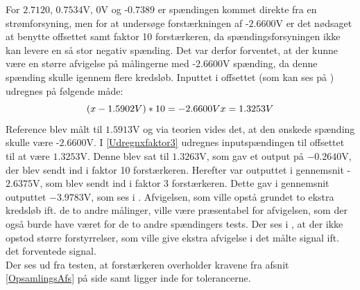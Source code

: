 For $2.7120$, $0.7534$V, $0$V og -$0.7389$ er spændingen kommet direkte fra en strømforsyning, men for at undersøge forstærkningen af -$2.6600$V er det nødsaget at benytte offsettet samt faktor 10 forstærkeren, da spændingsforsyningen ikke kan levere en så stor negativ spænding. Det var derfor forventet, at der kunne være en større afvigelse på målingerne med -$2.6600$V spænding, da denne spænding skulle igennem flere kredsløb. Inputtet i offsettet (som kan ses på ) udregnes på følgende måde:
\begin{equation}\label{Udregnxfaktor3}
( x - 1.5902V ) * 10 = -2.6600V \\
x = 1.3253V
\end{equation}
Reference blev målt til $1.5913$V og via teorien vides det, at den ønskede spænding skulle være -$2.6600$V. I \eqref{Udregnxfaktor3} udregnes inputspændingen til offsettet til at være $1.3253$V. Denne blev sat til $1.3263$V, som gav et output på $-0.2640$V, der blev sendt ind i faktor 10 forstærkeren. Herefter var outputtet i gennemsnit -$2.6375$V, som blev sendt ind i faktor 3 forstærkeren. Dette gav i gennemsnit outputtet $-3.9783$V, som ses i . Afvigelsen, som ville opstå grundet to ekstra kredsløb ift. de to andre målinger, ville være præsentabel for afvigelsen, som der også burde have været for de to andre spændingers tests. Der ses i , at der ikke opstod større forstyrrelser, som ville give ekstra afvigelse i det målte signal ift. det forventede signal. \\
Der ses ud fra testen, at forstærkeren overholder kravene fra afsnit \ref{OpsamlingsAfs} på side \pageref{OpsamlingsAfs} samt ligger inde for tolerancerne.
